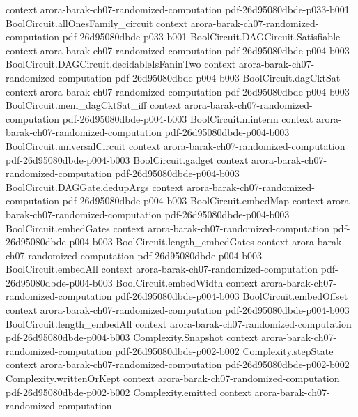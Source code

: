 \begin{theorem}
  {context}
  {arora-barak-ch07-randomized-computation}
  {pdf-26d95080dbde-p033-b001}
\proofstep
  {BoolCircuit.allOnesFamily_circuit}
  {context}
  {arora-barak-ch07-randomized-computation}
  {pdf-26d95080dbde-p033-b001}
\proofstep
  {BoolCircuit.DAGCircuit.Satisfiable}
  {context}
  {arora-barak-ch07-randomized-computation}
  {pdf-26d95080dbde-p004-b003}
\proofstep
  {BoolCircuit.DAGCircuit.decidableIsFaninTwo}
  {context}
  {arora-barak-ch07-randomized-computation}
  {pdf-26d95080dbde-p004-b003}
\proofstep
  {BoolCircuit.dagCktSat}
  {context}
  {arora-barak-ch07-randomized-computation}
  {pdf-26d95080dbde-p004-b003}
\proofstep
  {BoolCircuit.mem_dagCktSat_iff}
  {context}
  {arora-barak-ch07-randomized-computation}
  {pdf-26d95080dbde-p004-b003}
\proofstep
  {BoolCircuit.minterm}
  {context}
  {arora-barak-ch07-randomized-computation}
  {pdf-26d95080dbde-p004-b003}
\proofstep
  {BoolCircuit.universalCircuit}
  {context}
  {arora-barak-ch07-randomized-computation}
  {pdf-26d95080dbde-p004-b003}
\proofstep
  {BoolCircuit.gadget}
  {context}
  {arora-barak-ch07-randomized-computation}
  {pdf-26d95080dbde-p004-b003}
\proofstep
  {BoolCircuit.DAGGate.dedupArgs}
  {context}
  {arora-barak-ch07-randomized-computation}
  {pdf-26d95080dbde-p004-b003}
\proofstep
  {BoolCircuit.embedMap}
  {context}
  {arora-barak-ch07-randomized-computation}
  {pdf-26d95080dbde-p004-b003}
\proofstep
  {BoolCircuit.embedGates}
  {context}
  {arora-barak-ch07-randomized-computation}
  {pdf-26d95080dbde-p004-b003}
\proofstep
  {BoolCircuit.length_embedGates}
  {context}
  {arora-barak-ch07-randomized-computation}
  {pdf-26d95080dbde-p004-b003}
\proofstep
  {BoolCircuit.embedAll}
  {context}
  {arora-barak-ch07-randomized-computation}
  {pdf-26d95080dbde-p004-b003}
\proofstep
  {BoolCircuit.embedWidth}
  {context}
  {arora-barak-ch07-randomized-computation}
  {pdf-26d95080dbde-p004-b003}
\proofstep
  {BoolCircuit.embedOffset}
  {context}
  {arora-barak-ch07-randomized-computation}
  {pdf-26d95080dbde-p004-b003}
\proofstep
  {BoolCircuit.length_embedAll}
  {context}
  {arora-barak-ch07-randomized-computation}
  {pdf-26d95080dbde-p004-b003}
\proofstep
  {Complexity.Snapshot}
  {context}
  {arora-barak-ch07-randomized-computation}
  {pdf-26d95080dbde-p002-b002}
\proofstep
  {Complexity.stepState}
  {context}
  {arora-barak-ch07-randomized-computation}
  {pdf-26d95080dbde-p002-b002}
\proofstep
  {Complexity.writtenOrKept}
  {context}
  {arora-barak-ch07-randomized-computation}
  {pdf-26d95080dbde-p002-b002}
\proofstep
  {Complexity.emitted}
  {context}
  {arora-barak-ch07-randomized-computation}

\end{theorem}
